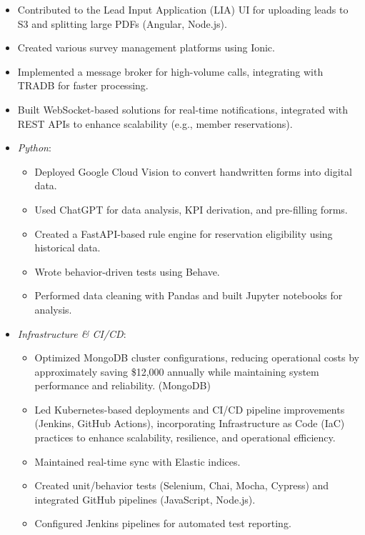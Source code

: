 \documentclass{res} %
\begin{document}
\begin{resume}
\begin{itemize}
      \begin{itemize}
        \item Backend uses a tree data structure for complex survey logic.
        \item Frontend built with Ionic (Angular, Node.js).
      \end{itemize}
    \item Contributed to the Lead Input Application (LIA) UI for uploading leads to S3 and splitting large PDFs (Angular, Node.js).
    \item Created various survey management platforms using Ionic.
    \item Implemented a message broker for high-volume calls, integrating with TRADB for faster processing.
    \item  Built WebSocket-based solutions for real-time notifications, integrated with REST APIs to enhance scalability (e.g., member reservations). \smallskip
    \item \emph{Python}:
      \begin{itemize}
        \item Deployed Google Cloud Vision to convert handwritten forms into digital data.
        \item Used ChatGPT for data analysis, KPI derivation, and pre-filling forms.
        \item Created a FastAPI-based rule engine for reservation eligibility using historical data.
        \item Wrote behavior-driven tests using Behave.
        \item Performed data cleaning with Pandas and built Jupyter notebooks for analysis.
      \end{itemize}
    \item \emph{Infrastructure \& CI/CD}:
      \begin{itemize}
        \item Optimized MongoDB cluster configurations, reducing operational costs by approximately saving \$12,000 annually while maintaining system performance and reliability. (MongoDB)
        \item Led Kubernetes-based deployments and CI/CD pipeline improvements (Jenkins, GitHub Actions), incorporating Infrastructure as Code (IaC) practices to enhance scalability, resilience, and operational efficiency.
        \item Maintained real-time sync with Elastic indices.
        \item Created unit/behavior tests (Selenium, Chai, Mocha, Cypress) and integrated GitHub pipelines (JavaScript, Node.js).
        \item Configured Jenkins pipelines for automated test reporting.
      \end{itemize}
  \end{itemize}


\end{resume}
\end{document}
